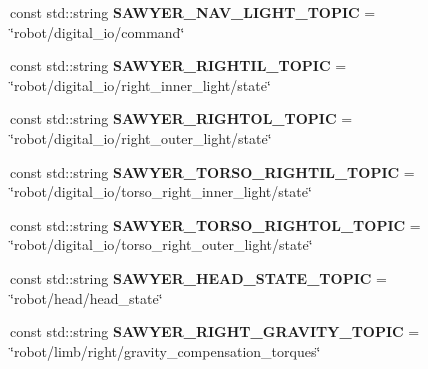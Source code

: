 \begin{DoxyCompactItemize}
\item 
\hypertarget{namespacesawyer__en_a19d36b48384d621dcba8529f627406d3}{const std\-::string {\bfseries S\-A\-W\-Y\-E\-R\-\_\-\-N\-A\-V\-\_\-\-L\-I\-G\-H\-T\-\_\-\-T\-O\-P\-I\-C} = \char`\"{}robot/digital\-\_\-io/command\char`\"{}}\label{namespacesawyer__en_a19d36b48384d621dcba8529f627406d3}

\item 
\hypertarget{namespacesawyer__en_afe637197426a53f02e8f39e9d94c4862}{const std\-::string {\bfseries S\-A\-W\-Y\-E\-R\-\_\-\-R\-I\-G\-H\-T\-I\-L\-\_\-\-T\-O\-P\-I\-C} = \char`\"{}robot/digital\-\_\-io/right\-\_\-inner\-\_\-light/state\char`\"{}}\label{namespacesawyer__en_afe637197426a53f02e8f39e9d94c4862}

\item 
\hypertarget{namespacesawyer__en_aeac38e8d0208c9ac5a3fd2bb65a6d5e0}{const std\-::string {\bfseries S\-A\-W\-Y\-E\-R\-\_\-\-R\-I\-G\-H\-T\-O\-L\-\_\-\-T\-O\-P\-I\-C} = \char`\"{}robot/digital\-\_\-io/right\-\_\-outer\-\_\-light/state\char`\"{}}\label{namespacesawyer__en_aeac38e8d0208c9ac5a3fd2bb65a6d5e0}

\item 
\hypertarget{namespacesawyer__en_aff31e1f96453b1d0cbc77f4644e43eb8}{const std\-::string {\bfseries S\-A\-W\-Y\-E\-R\-\_\-\-T\-O\-R\-S\-O\-\_\-\-R\-I\-G\-H\-T\-I\-L\-\_\-\-T\-O\-P\-I\-C} = \char`\"{}robot/digital\-\_\-io/torso\-\_\-right\-\_\-inner\-\_\-light/state\char`\"{}}\label{namespacesawyer__en_aff31e1f96453b1d0cbc77f4644e43eb8}

\item 
\hypertarget{namespacesawyer__en_aa7827f44e90a4b5ea8f93508bdf4d05a}{const std\-::string {\bfseries S\-A\-W\-Y\-E\-R\-\_\-\-T\-O\-R\-S\-O\-\_\-\-R\-I\-G\-H\-T\-O\-L\-\_\-\-T\-O\-P\-I\-C} = \char`\"{}robot/digital\-\_\-io/torso\-\_\-right\-\_\-outer\-\_\-light/state\char`\"{}}\label{namespacesawyer__en_aa7827f44e90a4b5ea8f93508bdf4d05a}

\item 
\hypertarget{namespacesawyer__en_a4e542a1e49b9d68b683c7999393938b3}{const std\-::string {\bfseries S\-A\-W\-Y\-E\-R\-\_\-\-H\-E\-A\-D\-\_\-\-S\-T\-A\-T\-E\-\_\-\-T\-O\-P\-I\-C} = \char`\"{}robot/head/head\-\_\-state\char`\"{}}\label{namespacesawyer__en_a4e542a1e49b9d68b683c7999393938b3}

\item 
\hypertarget{namespacesawyer__en_a81234f2732c3a467b2594da871fc15ad}{const std\-::string {\bfseries S\-A\-W\-Y\-E\-R\-\_\-\-R\-I\-G\-H\-T\-\_\-\-G\-R\-A\-V\-I\-T\-Y\-\_\-\-T\-O\-P\-I\-C} = \char`\"{}robot/limb/right/gravity\-\_\-compensation\-\_\-torques\char`\"{}}\label{namespacesawyer__en_a81234f2732c3a467b2594da871fc15ad}


\end{DoxyCompactItemize}
